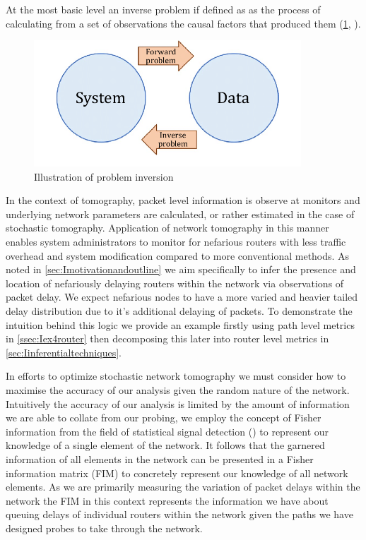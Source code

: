 At the most basic level an inverse problem if defined as as the process of calculating from a set of observations the causal factors that produced them (\cref{fig:probleminv}, \cite{sadri_effect_2019}).
\begin{figure}[H]
    \centering
    \includegraphics[width=10cm]{figs/intro/inverse_problems.png}
    \caption[Illustration of problem inversion]{Illustration of problem inversion \cite{sadri_effect_2019}}
    \label{fig:probleminv}
\end{figure}
In the context of tomography, packet level information is observe at monitors and underlying network parameters are calculated, or rather estimated in the case of stochastic tomography. Application of network tomography in this manner enables system administrators to monitor for nefarious routers with less traffic overhead and system modification compared to more conventional methods. As noted in \cref{sec:Imotivationandoutline} we aim specifically to infer the presence and location of nefariously delaying routers within the network via observations of packet delay. We expect nefarious nodes to have a more varied and heavier tailed delay distribution due to it's additional delaying of packets. To demonstrate the intuition behind this logic we provide an example firstly using path level metrics in \cref{ssec:Iex4router} then decomposing this later into router level metrics in \cref{sec:Iinferentialtechniques}.\par
In efforts to optimize stochastic network tomography we must consider how to maximise the accuracy of our analysis given the random nature of the network. Intuitively the accuracy of our analysis is limited by the amount of information we are able to collate from our probing, we employ the concept of Fisher information from the field of statistical signal detection (\cite{poor_introduction_1994}) to represent our knowledge of a single element of the network. It follows that the garnered information of all elements in the network can be presented in a Fisher information matrix (FIM) to concretely represent our knowledge of all network elements. As we are primarily measuring the variation of packet delays within the network the FIM in this context represents the information we have about queuing delays of individual routers within the network given the paths we have designed probes to take through the network.\par
